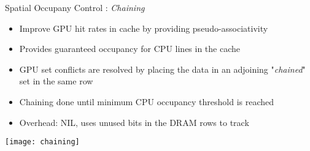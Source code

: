 \documentclass[final,t]{beamer}
\begin{document}
\begin{frame}[t,fragile]{}
\begin{columns}[t]
\begin{column}{.47\linewidth}
    \begin{exampleblock}{Spatial Occupany Control : \textit{Chaining}}
    \begin{itemize}
	    \item Improve GPU hit rates in cache by providing pseudo-associativity
	    \item Provides guaranteed occupancy for CPU lines in the cache
	    \item GPU set conflicts are resolved by placing the data in an adjoining "\textit{chained}" set in the same row
	    \item Chaining done until minimum CPU occupancy threshold is reached
	    \item Overhead: NIL, uses unused bits in the DRAM rows to track
    \end{itemize}
    \vspace{\baselineskip}
    \centering
    \texttt{[image: chaining]}
    \end{exampleblock}
    
       
\end{column}

\end{columns}

\end{frame}
\end{document}
